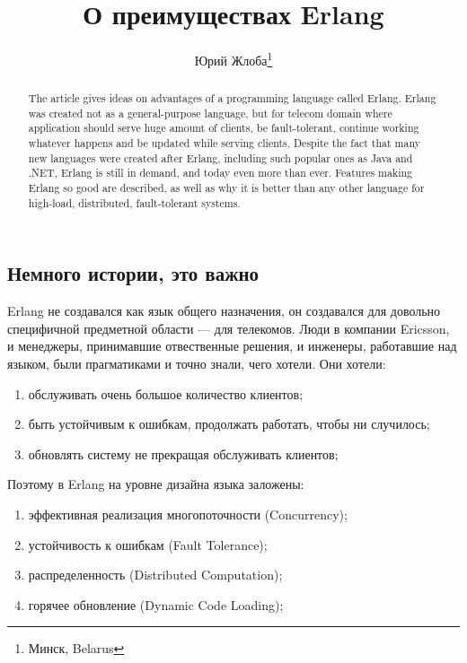 \documentclass[10pt, a5paper]{article}
\begin{document}
\title{О преимуществах Erlang}%

\author{Юрий Жлоба\footnote{Минск, Belarus}}
\maketitle

\begin{abstract}
The article gives ideas on advantages of a programming language called Erlang.
Erlang was created not as a general-purpose \linebreak language, but for telecom domain where application should serve huge amount of clients, be fault-tolerant,  continue working \linebreak whatever happens and be updated while serving clients.
Despite the fact that many new languages were created after Erlang, including such popular ones as Java and .NET, Erlang is still in demand, and today even more than ever.
Features making Erlang so good are described, as well as why it is better than any other language for high-load, distributed, fault-tolerant systems.
\end{abstract}


\subsection*{Немного истории, это важно}

Erlang не создавался как язык общего назначения, он создавался для довольно специфичной предметной области --- для телекомов. Люди в компании Ericsson, и менеджеры, принимавшие отвественные решения, и инженеры, работавшие над языком, были прагматиками и точно знали, чего хотели. Они хотели:

\begin{enumerate}
  \item обслуживать очень большое количество клиентов;
  \item быть устойчивым к ошибкам, продолжать работать, чтобы ни случилось;
  \item обновлять систему не прекращая обслуживать клиентов;
\end{enumerate}

Поэтому в Erlang на уровне дизайна языка заложены:

\begin{enumerate}
  \item эффективная реализация многопоточности (Concurrency);
  \item устойчивость к ошибкам (Fault Tolerance);
  \item распределенность (Distributed Computation);
  \item горячее обновление (Dynamic Code Loading);
\end{enumerate}
\end{document}
